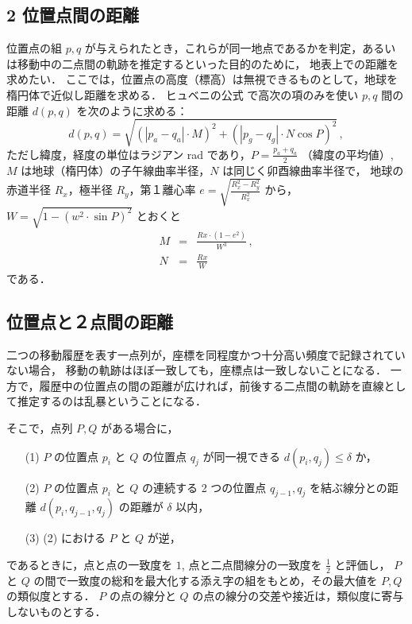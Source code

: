 \documentclass[11pt]{jarticle}
\begin{document}
\subsection{2 位置点間の距離}
位置点の組 $p, q$ が与えられたとき，これらが同一地点であるかを判定，あるいは移動中の二点間の軌跡を推定するといった目的のために，
地表上での距離を求めたい．
ここでは，位置点の高度（標高）は無視できるものとして，地球を楕円体で近似し距離を求める．
ヒュベニの公式 \cite{amano-tec,GSI,Hubeny-formula-ref1,Hubeny-formula-ref2} で高次の項のみを使い $p, q$ 間の距離 $d(p,q)$ を次のように求める：
\[
d(p,q) = \sqrt{(|p_a - q_a|\cdot M)^2 + \left(|p_g - q_g|\cdot N\cos{P} \right)^2} \,,
\]
ただし緯度，経度の単位はラジアン rad であり，$P = \frac{p_a+q_a}{2}$ （緯度の平均値）, $M$ は地球（楕円体）の子午線曲率半径，$N$ は同じく卯酉線曲率半径で，
地球の赤道半径 $R_x$，極半径 $R_y$，第１離心率 $e=\sqrt{\frac{R_x^2 - R_y^2}{R_x^2}}$ から，$W = \sqrt{1 - (w^2 \cdot \sin P)^2}$ とおくと
\begin{eqnarray*}
M &=& \frac{Rx\cdot (1 - e^2)}{W^3} \,, \\
N &=& \frac{Rx}{W}
\end{eqnarray*}
である．

\subsection{位置点と２点間の距離}

二つの移動履歴を表す一点列が，座標を同程度かつ十分高い頻度で記録されていない場合，
移動の軌跡はほぼ一致しても，座標点は一致しないことになる．
一方で，履歴中の位置点の間の距離が広ければ，前後する二点間の軌跡を直線として推定するのは乱暴ということになる．

そこで，点列 $P, Q$ がある場合に，
\begin{itemize}
\item[(1)] $P$ の位置点 $p_i$ と $Q$ の位置点 $q_j$ が同一視できる $d(p_i, q_j) \leq \delta$ か，
\item[(2)] $P$ の位置点 $p_i$ と $Q$ の連続する 2 つの位置点 $q_{j-1}, q_j$ を結ぶ線分との距離 $d(p_i, q_{j-1}, q_j)$ の距離が $\delta$ 以内，
\item[(3)] (2) における $P$ と $Q$ が逆，
\end{itemize}
であるときに，点と点の一致度を $1$, 点と二点間線分の一致度を $\frac{1}{2}$ と評価し，
$P$ と $Q$ の間で一致度の総和を最大化する添え字の組をもとめ，その最大値を $P, Q$ の類似度とする．
$P$ の点の線分と $Q$ の点の線分の交差や接近は，類似度に寄与しないものとする．
\end{document}
